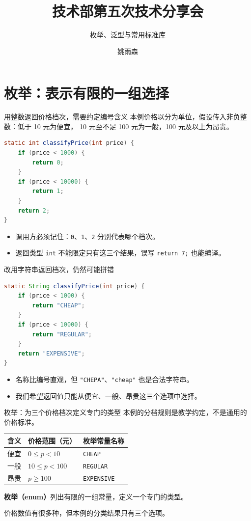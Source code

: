 \documentclass[aspectratio=169]{beamer}
\title[技术部第五次分享]{技术部第五次技术分享会}
\subtitle{枚举、泛型与常用标准库}
\author{姚雨森}
\institute{技术部 分管主席}
\date{}
\begin{document}
\maketitle

\section{枚举：表示有限的一组选择}

\begin{frame}[fragile]{用整数返回价格档次，需要约定编号含义}
  本例价格以分为单位，假设传入非负整数：低于 10 元为便宜，
  10 元至不足 100 元为一般，100 元及以上为昂贵。
  \begin{lstlisting}[language=Java]
static int classifyPrice(int price) {
    if (price < 1000) {
        return 0;
    }
    if (price < 10000) {
        return 1;
    }
    return 2;
}
  \end{lstlisting}
  \begin{itemize}
    \item 调用方必须记住：\texttt{0}、\texttt{1}、\texttt{2} 分别代表哪个档次。
    \item 返回类型 \texttt{int} 不能限定只有这三个结果，误写 \texttt{return 7;} 也能编译。
  \end{itemize}
\end{frame}

\begin{frame}[fragile]{改用字符串返回档次，仍然可能拼错}
  \begin{lstlisting}[language=Java]
static String classifyPrice(int price) {
    if (price < 1000) {
        return "CHEAP";
    }
    if (price < 10000) {
        return "REGULAR";
    }
    return "EXPENSIVE";
}
  \end{lstlisting}
  \begin{itemize}
    \item 名称比编号直观，但 \texttt{"CHEPA"}、\texttt{"cheap"} 也是合法字符串。
    \item 我们希望返回值只能从\alert{便宜、一般、昂贵}这三个选项中选择。
  \end{itemize}
\end{frame}

\begin{frame}{枚举：为三个价格档次定义专门的类型}
  本例的分档规则是教学约定，不是通用的价格标准。
  \begin{center}
    \renewcommand{\arraystretch}{1.35}
    \begin{tabular}{lll}
      \textbf{含义} & \textbf{价格范围（元）} & \textbf{枚举常量名称} \\
      \hline
      便宜 & $0 \leq p < 10$ & \texttt{CHEAP} \\
      一般 & $10 \leq p < 100$ & \texttt{REGULAR} \\
      昂贵 & $p \geq 100$ & \texttt{EXPENSIVE} \\
    \end{tabular}
  \end{center}
  \bigskip
  \textbf{枚举（enum）}列出有限的一组常量，定义一个专门的类型。
  \par\medskip
  价格数值有很多种，但本例的\alert{分类结果只有三个选项}。
\end{frame}
\end{document}
